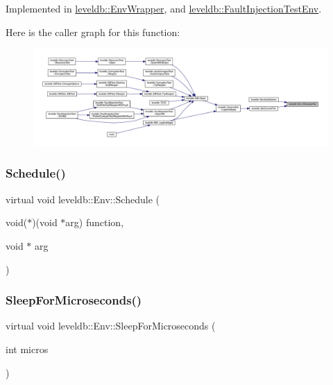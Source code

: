 Implemented in \mbox{\hyperlink{classleveldb_1_1_env_wrapper_a242f2f6f35bd043ba6905a49704d20c9}{leveldb\+::\+Env\+Wrapper}}, and \mbox{\hyperlink{classleveldb_1_1_fault_injection_test_env_ac283e671532ee024cf22f84b95680061}{leveldb\+::\+Fault\+Injection\+Test\+Env}}.

Here is the caller graph for this function\+:
\nopagebreak
\begin{figure}[H]
\begin{center}
\leavevmode
\includegraphics[width=350pt]{classleveldb_1_1_env_abd743b3d4751ada1ab307427827ed5b0_icgraph}
\end{center}
\end{figure}
\mbox{\label{classleveldb_1_1_env_a6b5fc50322d8404f5b13fad0e03d8724}} 
\subsubsection{\texorpdfstring{Schedule()}{Schedule()}}
{\footnotesize\ttfamily virtual void leveldb\+::\+Env\+::\+Schedule (\begin{DoxyParamCaption}\item[{void($\ast$)(void $\ast$arg)}]{function,  }\item[{void $\ast$}]{arg }\end{DoxyParamCaption})\hspace{0.3cm}{\ttfamily [pure virtual]}}

\mbox{\label{classleveldb_1_1_env_a43ad838cfb08db3d9e2197800cd33312}} 
\subsubsection{\texorpdfstring{SleepForMicroseconds()}{SleepForMicroseconds()}}
{\footnotesize\ttfamily virtual void leveldb\+::\+Env\+::\+Sleep\+For\+Microseconds (\begin{DoxyParamCaption}\item[{int}]{micros }\end{DoxyParamCaption})\hspace{0.3cm}{\ttfamily [pure virtual]}}



